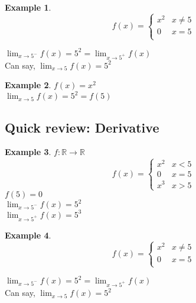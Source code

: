 \documentclass[twocolumn,20pt,fleqn]{extarticle}
\theoremstyle{plain}
\theoremstyle{definition}
\newtheorem*{example}{Example}
\theoremstyle{remark}
\begin{document}
\begin{example}
  \[f(x) =
      \begin{cases}
        x^2 & x  \neq  5\\
        0 & x = 5\\
        
      \end{cases}
      \]
      
      


$\displaystyle\lim_{x \to 5^-} f(x) = 5^2  = \displaystyle\lim_{x \to 5^+} f(x)$\\
Can say, $\displaystyle\lim_{x \to 5} f(x) = 5^2$
\end{example}

\newpage
\begin{example}
$f(x) = x^2$\\
$\displaystyle\lim_{x \to 5} f(x) = 5^2 = f(5)$\end{example}


\clearpage



\subsection{Quick review: Derivative}
\begin{example}
  $f : \mathbb{R}\to \mathbb{R}$
  \[f(x) =
      \begin{cases}
        x^2 & x < 5\\
        0 & x = 5\\
        x^3 & x > 5
      \end{cases}
      \]
      $f(5)=0$\\
$\displaystyle\lim_{x \to 5^-} f(x)  = 5^2$\\
$\displaystyle\lim_{x \to 5^+} f(x)  = 5^3$
\end{example}


\begin{example}
  \[f(x) =
      \begin{cases}
        x^2 & x  \neq  5\\
        0 & x = 5\\
        
      \end{cases}
      \]
      
      


$\displaystyle\lim_{x \to 5^-} f(x) = 5^2  = \displaystyle\lim_{x \to 5^+} f(x)$\\
Can say, $\displaystyle\lim_{x \to 5} f(x) = 5^2$
\end{example}
\end{document}
